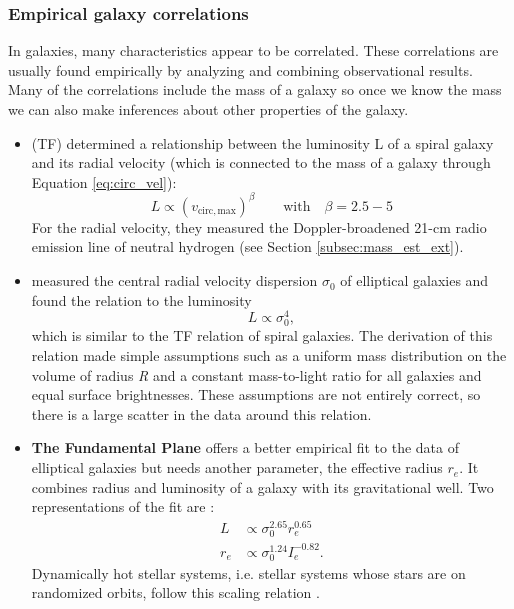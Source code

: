 \subsubsection{Empirical galaxy correlations}
In galaxies, many characteristics appear to be correlated. These correlations are usually found empirically by analyzing and combining observational results. Many of the correlations include the mass of a galaxy so once we know the mass we can also make inferences about other properties of the galaxy. 
\begin{itemize}
    \item \textbf{\citet{Tully...Fisher...1977}} (TF) determined a relationship between the luminosity L of a spiral galaxy and its radial velocity (which is connected to the mass of a galaxy through Equation \ref{eq:circ_vel}):
    \begin{equation}
        L \propto (v_{\mathrm{circ, max}})^\beta \qquad \mathrm{with}\quad \beta =  2.5 - 5
    \end{equation}
    For the radial velocity, they measured the Doppler-broadened 21-cm radio emission line of neutral hydrogen (see Section \ref{subsec:mass_est_ext}). 
    \item \textbf{\citet{Faber...Jackson...1976}} measured the central radial velocity dispersion $\sigma_0$ of elliptical galaxies and found the relation to the luminosity  
    \begin{equation}
        L \propto \sigma_0^4,
    \end{equation}
    which is similar to the \acs{TF} relation of spiral galaxies. The derivation of this relation made simple assumptions such as a uniform mass distribution on the volume of radius \textit{R} and a constant mass-to-light ratio for all galaxies and equal surface brightnesses. These assumptions are not entirely correct, so there is a large scatter in the data around this relation.
    \item \textbf{The Fundamental Plane} offers a better empirical fit to the data of elliptical galaxies but needs another parameter, the effective radius $r_e$. It combines radius and luminosity of a galaxy with its gravitational well. Two representations of the fit are \citep{Carroll...Ostlie..2006}:
    \begin{align}
        L &\propto \sigma_0^{2.65}r_e^{0.65} \\
        r_e &\propto \sigma_0^{1.24}I_e^{-0.82}.
    \end{align}
    Dynamically hot stellar systems, i.e. stellar systems whose stars are on randomized orbits, follow this scaling relation \citep{Misgeld...hotss.FP...2011}.

\end{itemize}

